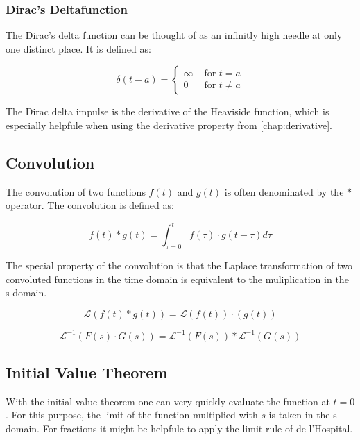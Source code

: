 \documentclass[./\jobname.tex]{subfiles}
\begin{document}
\subsubsection{Dirac's Deltafunction}

The Dirac's delta function can be thought of as an infinitly high needle at only one distinct place. It is defined as: 

\begin{equation}
	\delta (t-a) = 
	\begin{cases}
	\infty & \text{ for } t = a \\
	0 & \text{ for } t \neq a
	\end{cases}
\end{equation}

The Dirac delta impulse is the derivative of the Heaviside function, which is especially helpfule when using the derivative property from \ref{chap:derivative}. 

\subsection{Convolution}

The convolution of two functions $f(t)$ and $g(t)$ is often denominated by the $*$ operator. The convolution is defined as:

\begin{equation}
	f(t)*g(t) = \int_{\tau = 0}^{t} f(\tau) \cdot g(t-\tau) d\tau
\end{equation}

The special property of the convolution is that the Laplace transformation of two convoluted functions in the time domain is equivalent to the muliplication in the s-domain. 

\begin{equation}
	\mathcal{L} \left( f(t) * g(t) \right) = \mathcal{L} \left( f(t) \right) \cdot \left( g(t) \right)
\end{equation}

\begin{equation}
	\mathcal{L}^{-1} \left( F(s) \cdot G(s) \right) = \mathcal{L}^{-1}( F(s)) * \mathcal{L}^{-1} (G(s))
\end{equation}

\subsection{Initial Value Theorem}

With the initial value theorem one can very quickly evaluate the function at $t=0$. For this purpose, the limit of the function multiplied with $s$ is taken in the s-domain. For fractions it might be helpfule to apply the limit rule of de l'Hospital. 
\end{document}
